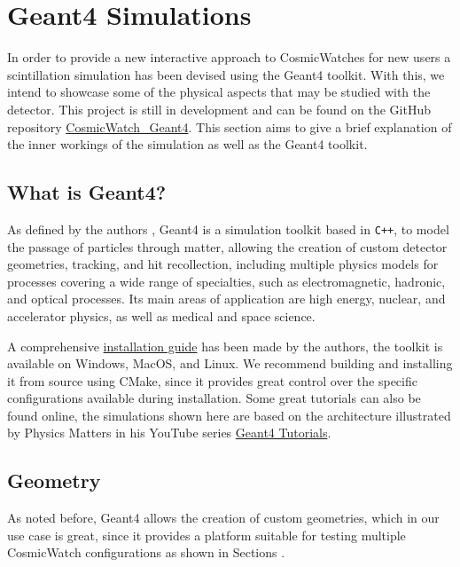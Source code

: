 \chapter{Geant4 Simulations}

In order to provide a new interactive approach to CosmicWatches for new users a scintillation simulation has been devised using the Geant4 toolkit. With this, we intend to showcase some of the physical aspects that may be studied with the detector. This project is still in development and can be found on the GitHub repository \href{https://github.com/spenceraxani/CosmicWatch_Geant4}{CosmicWatch\_Geant4}. This section aims to give a brief explanation of the inner workings of the simulation as well as the Geant4 toolkit.

\section{What is Geant4?}

As defined by the authors \cite{Geant4}, Geant4 is a simulation toolkit based in \texttt{C++}, to model the passage of particles through matter, allowing the creation of custom detector geometries, tracking, and hit recollection, including multiple physics models for processes covering a wide range of specialties, such as electromagnetic, hadronic, and optical processes. Its main areas of application are high energy, nuclear, and accelerator physics, as well as medical and space science.

A comprehensive \href{https://geant4-userdoc.web.cern.ch/UsersGuides/InstallationGuide/html/}{installation guide} has been made by the authors, the toolkit is available on Windows, MacOS, and Linux. We recommend building and installing it from source using CMake, since it provides great control over the specific configurations available during installation. Some great tutorials can also be found online, the simulations shown here are based on the architecture illustrated by Physics Matters in his YouTube series \href{https://youtube.com/playlist?list=PLLybgCU6QCGWgzNYOV0SKen9vqg4KXeVL&si=mdzOyTZS0DYsf_vc}{Geant4 Tutorials}.

\section{Geometry}

As noted before, Geant4 allows the creation of custom geometries, which in our use case is great, since it provides a platform suitable for testing multiple CosmicWatch configurations as shown in Sections .

